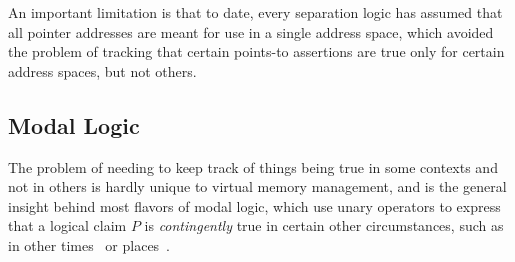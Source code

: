 An important limitation  is that to date, every separation logic
has assumed that all pointer addresses are meant for use in a single address space, which avoided the
problem of tracking that certain points-to assertions are true only for certain address spaces, but not others.

\subsection{Modal Logic}
\label{sec:backgroundonmodallogic}
The problem of needing to keep track of things being true in some contexts and not in others is hardly unique to virtual 
memory management, and is the general insight behind most flavors of modal logic, which use
unary operators to express that a logical claim $P$ is \emph{contingently} true 
in certain other circumstances, such as in other times~\cite{pnueli1977temporal} or places~\cite{murphy2008type,gordon2019modal}.


